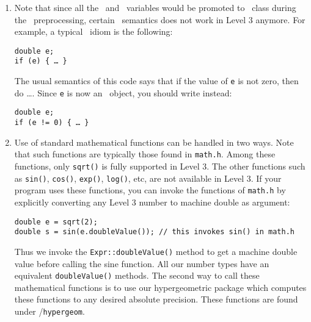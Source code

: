 \documentclass[12pt]{article}
\begin{document}
\begin{enumerate}
\item
Note that since all the \double\ and \lng\ variables would be 
promoted to \expr\ class during the \candcpp\ preprocessing, 
certain \candcpp\ semantics does not work in
Level 3 anymore. For example, a typical \candcpp\ idiom is the following:

\begin{progb} {
\> \tt double e;\\
\> \tt if (e) \{ \ldots\ \}
}\end{progb}
\noindent
The usual semantics of this code says that 
if the value of {\tt e} is not zero, then do \ldots .
Since {\tt e} is now an \expr\ object, you should write instead:


\begin{progb} {
\> \tt double e;\\
\> \tt if (e != 0) \{ \ldots\ \}
}\end{progb}


\item
Use of standard mathematical functions can be handled in
two ways.  Note that such functions are typically those found
in \texttt{math.h}.   Among these functions, only \texttt{sqrt()}
is fully supported in Level 3.  The other functions such as
\texttt{sin()}, 
\texttt{cos()}, 
\texttt{exp()}, 
\texttt{log()}, etc, are not available in Level 3.
If your program uses these functions, you can invoke
the functions of \texttt{math.h} by explicitly
converting any Level 3 number to machine double as argument:

\begin{progb} {
\> \tt double e = sqrt(2);  \\
\> \tt double s = sin(e.doubleValue());   // this invokes sin() in math.h
}\end{progb}

Thus we invoke the \texttt{Expr::doubleValue()} method
to get a machine double value before calling the sine function.
All our number types have an equivalent \texttt{doubleValue()}
methods.  The second way to call these mathematical functions
is to use our hypergeometric package which computes
these functions to any desired absolute precision.
These functions are found under \progsdir/\texttt{hypergeom}.


\end{enumerate}
\end{document}
